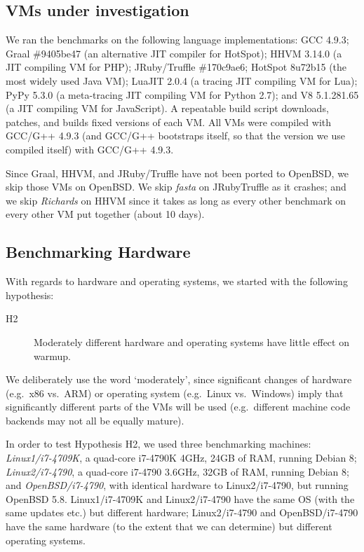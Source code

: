 \documentclass[preprint,numbers,10pt]{sigplanconf}
\newcommand{\hyptwo}{H2\xspace}
\newcommand{\richards}{\emph{Richards}\xspace}
\newcommand{\fasta}{\emph{fasta}\xspace}
\newcommand{\bencherthree}{Linux1/i7-4709K\xspace}
\newcommand{\bencherfive}{Linux2/i7-4790\xspace}
\newcommand{\benchersix}{OpenBSD/i7-4790\xspace}
\begin{document}
\subsection{VMs under investigation}

We ran the benchmarks on the following language implementations: GCC 4.9.3;
Graal \#9405be47 (an alternative JIT compiler for HotSpot); HHVM 3.14.0 (a JIT
compiling VM for PHP); JRuby/Truffle \#170c9ae6; HotSpot 8u72b15 (the most widely used Java
VM); LuaJIT 2.0.4 (a tracing JIT compiling VM for Lua); PyPy 5.3.0 (a
meta-tracing JIT compiling VM for Python 2.7); and V8 5.1.281.65 (a JIT
compiling VM for JavaScript). A repeatable build script downloads, patches,
and builds fixed versions of each VM. All VMs were compiled with GCC/G++ 4.9.3
(and GCC/G++ bootstraps itself, so that the version we use compiled itself)
with GCC/G++ 4.9.3.

Since Graal, HHVM, and JRuby/Truffle have not been ported to OpenBSD, we
skip those VMs on OpenBSD. We skip \fasta on JRubyTruffle as it crashes;
and we skip \richards on HHVM since it takes as long as every other benchmark
on every other VM put together (about 10 days).


\subsection{Benchmarking Hardware}

With regards to hardware and operating systems, we started with the
following hypothesis:
\begin{description}
  \item[\hyptwo] Moderately different hardware and operating systems have little effect on warmup.
\end{description}
We deliberately use the word `moderately', since significant changes of hardware
(e.g.~x86 vs.~ARM) or operating system (e.g.~Linux vs.~Windows) imply that
significantly different parts of the VMs will be used (e.g.~different machine
code backends may not all be equally mature).

In order to test Hypothesis H2, we used three benchmarking machines: \emph{\bencherthree}, a quad-core i7-4790K
4GHz, 24GB of RAM, running Debian 8; \emph{\bencherfive}, a quad-core i7-4790
3.6GHz, 32GB of RAM, running Debian 8; and \emph{\benchersix}, with identical
hardware to \bencherfive, but running OpenBSD 5.8. \bencherthree and \bencherfive
have the same OS (with the same updates etc.) but different hardware; \bencherfive
and \benchersix have the same hardware (to the extent that we can determine)
but different operating systems.
\end{document}
